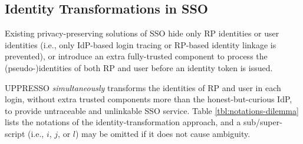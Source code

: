 
\subsection{Identity Transformations in SSO}
\label{subsec:solutions}


Existing privacy-preserving solutions of SSO hide only RP identities or user identities
    (i.e., only IdP-based login tracing or RP-based identity linkage is prevented),
        or introduce an extra fully-trusted component to process the (pseudo-)identities of both RP and user before an identity token is issued.

UPPRESSO \emph{simultaneously} transforms the identities of RP and user in each login,
        without extra trusted components more than the honest-but-curious IdP,
         to provide untraceable and unlinkable SSO service.
%
Table \ref{tbl:notations-dilemma} lists the notations of the identity-transformation approach,
and a sub/super-script (i.e., $i$, $j$, or $l$) may be omitted if it does not cause ambiguity.

